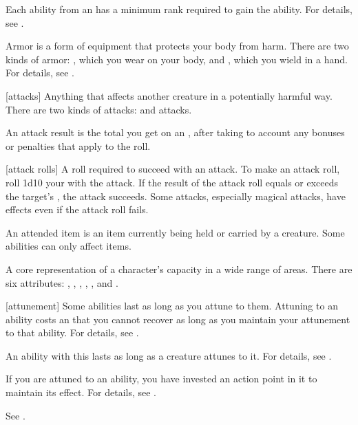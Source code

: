  Each ability from an  has a minimum rank required to gain the ability.
For details, see .

 Armor is a form of equipment that protects your body from harm.
There are two kinds of armor: , which you wear on your body, and , which you wield in a hand.
For details, see .

[attacks] Anything that affects another creature in a potentially harmful way. There are two kinds of attacks:  and  attacks.

 An attack result is the total you get on an , after taking to account any bonuses or penalties that apply to the roll.

[attack rolls] A roll required to succeed with an attack.
To make an attack roll, roll 1d10 \add your  with the attack.
If the result of the attack roll equals or exceeds the target's , the attack succeeds.
Some attacks, especially magical attacks, have effects even if the attack roll fails.

 An attended item is an item currently being held or carried by a creature.
Some abilities can only affect  items.

 A core representation of a character's capacity in a wide range of areas. There are six attributes: , , , , , and .

[attunement] Some abilities last as long as you attune to them.
Attuning to an ability costs an  that you cannot recover as long as you maintain your attunement to that ability.
For details, see .

 An ability with this  lasts as long as a creature attunes to it.
For details, see .

 If you are attuned to an ability, you have invested an action point in it to maintain its effect.
For details, see .

 See .

